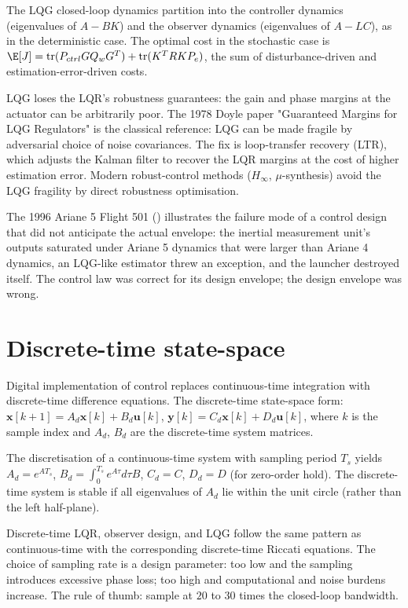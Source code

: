 The LQG closed-loop dynamics partition into the controller dynamics (eigenvalues of $A - BK$) and the observer dynamics (eigenvalues of $A - LC$), as in the deterministic case. The optimal cost in the stochastic case is $\E[J] = \text{tr}(P_{ctrl} G Q_w G^T) + \text{tr}(K^T R K P_e)$, the sum of disturbance-driven and estimation-error-driven costs.

LQG loses the LQR's robustness guarantees: the gain and phase margins at the actuator can be arbitrarily poor. The 1978 Doyle paper "Guaranteed Margins for LQG Regulators" is the classical reference: LQG can be made fragile by adversarial choice of noise covariances. The fix is loop-transfer recovery (LTR), which adjusts the Kalman filter to recover the LQR margins at the cost of higher estimation error. Modern robust-control methods ($H_\infty$, $\mu$-synthesis) avoid the LQG fragility by direct robustness optimisation.

The 1996 Ariane 5 Flight 501 (\cite{acc:ariane501-ifr}) illustrates the failure mode of a control design that did not anticipate the actual envelope: the inertial measurement unit's outputs saturated under Ariane 5 dynamics that were larger than Ariane 4 dynamics, an LQG-like estimator threw an exception, and the launcher destroyed itself. The control law was correct for its design envelope; the design envelope was wrong.

\section{Discrete-time state-space}

Digital implementation of control replaces continuous-time integration with discrete-time difference equations. The discrete-time state-space form: $\mathbf{x}[k+1] = A_d \mathbf{x}[k] + B_d \mathbf{u}[k]$, $\mathbf{y}[k] = C_d \mathbf{x}[k] + D_d \mathbf{u}[k]$, where $k$ is the sample index and $A_d$, $B_d$ are the discrete-time system matrices.

The discretisation of a continuous-time system with sampling period $T_s$ yields $A_d = e^{A T_s}$, $B_d = \int_0^{T_s} e^{A \tau} d\tau B$, $C_d = C$, $D_d = D$ (for zero-order hold). The discrete-time system is stable if all eigenvalues of $A_d$ lie within the unit circle (rather than the left half-plane).

Discrete-time LQR, observer design, and LQG follow the same pattern as continuous-time with the corresponding discrete-time Riccati equations. The choice of sampling rate is a design parameter: too low and the sampling introduces excessive phase loss; too high and computational and noise burdens increase. The rule of thumb: sample at $20$ to $30$ times the closed-loop bandwidth.

